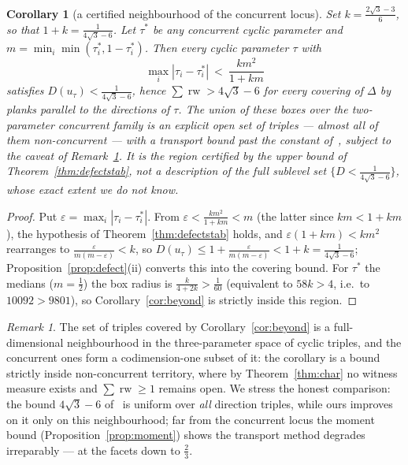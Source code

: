 \documentclass[11pt,reqno]{amsart}
\theoremstyle{plain}
\newtheorem{corollary}[theorem]{Corollary}
\theoremstyle{definition}
\theoremstyle{remark}
\newtheorem{remark}[theorem]{Remark}
\newcommand{\rw}{\operatorname{rw}}
\begin{document}
\begin{corollary}[a certified neighbourhood of the concurrent locus]
\label{cor:region}
Set $k=\tfrac{2\sqrt3-3}6$, so that $1+k=\tfrac1{4\sqrt3-6}$. Let $\tau^*$ be
any concurrent cyclic parameter and $m=\min_i\min(\tau_i^*,1-\tau_i^*)$. Then
every cyclic parameter $\tau$ with
\[
\max_i|\tau_i-\tau_i^*|\ <\ \frac{km^2}{1+km}
\]
satisfies $D(u_\tau)<\tfrac1{4\sqrt3-6}$, hence $\sum\rw>4\sqrt3-6$ for every
covering of $\Delta$ by planks parallel to the directions of $\tau$. The
union of these boxes over the two-parameter concurrent family is an explicit
open set of triples --- almost all of them non-concurrent --- with a
transport bound past the constant of~\cite{BY26}, subject to the caveat of
Remark~\ref{rem:beyond}. It is the region certified by the upper bound of
Theorem~\ref{thm:defectstab}, not a description of the full sublevel set
$\{D<\tfrac1{4\sqrt3-6}\}$, whose exact extent we do not know.
\end{corollary}

\begin{proof}
Put $\varepsilon=\max_i|\tau_i-\tau_i^*|$. From
$\varepsilon<\frac{km^2}{1+km}<m$ (the latter since $km<1+km$), the
hypothesis of Theorem~\ref{thm:defectstab} holds, and
$\varepsilon(1+km)<km^2$ rearranges to
$\frac\varepsilon{m(m-\varepsilon)}<k$, so
$D(u_\tau)\le1+\frac\varepsilon{m(m-\varepsilon)}<1+k=\tfrac1{4\sqrt3-6}$;
Proposition~\ref{prop:defect}(ii) converts this into the covering bound. For
$\tau^*$ the medians ($m=\tfrac12$) the box radius is
$\frac{k}{4+2k}>\tfrac1{60}$ (equivalent to $58k>4$, i.e.\ to
$10092>9801$), so Corollary~\ref{cor:beyond} is strictly inside this region.
\end{proof}

\begin{remark}\label{rem:beyond}
The set of triples covered by Corollary~\ref{cor:beyond} is a full-dimensional
neighbourhood in the three-parameter space of cyclic triples, and the concurrent
ones form a codimension-one subset of it: the corollary is a bound strictly
inside non-concurrent territory, where by Theorem~\ref{thm:char} no witness
measure exists and $\sum\rw\ge1$ remains open. We stress the honest comparison:
the bound $4\sqrt3-6$ of~\cite{BY26} is uniform over \emph{all} direction
triples, while ours improves on it only on this neighbourhood; far from the
concurrent locus the moment bound (Proposition~\ref{prop:moment}) shows the
transport method degrades irreparably --- at the facets down to $\tfrac23$.
\end{remark}
\end{document}
